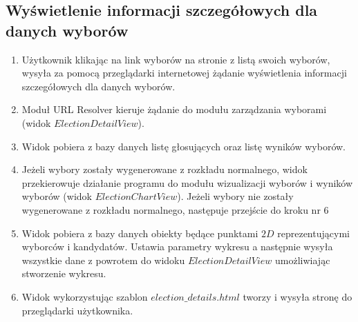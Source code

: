 \documentclass[pdflatex,11pt]{../aghdoc_version2}
\begin{document}
\subsection{Wyświetlenie informacji szczegółowych dla danych wyborów}
\begin{enumerate}
\item Użytkownik klikając na link wyborów na stronie z listą swoich wyborów, wysyła za
pomocą przeglądarki internetowej żądanie wyświetlenia informacji szczegółowych
dla danych wyborów.
\item Moduł URL Resolver kieruje żądanie do modułu zarządzania wyborami (widok
$ElectionDetailView$).
\item Widok pobiera z bazy danych listę głosujących oraz listę wyników wyborów.
\item Jeżeli wybory zostały wygenerowane z rozkładu normalnego, widok przekierowuje
działanie programu do modułu wizualizacji wyborów i wyników wyborów (widok
$ElectionChartView$). Jeżeli wybory nie zostały wygenerowane z rozkładu normalnego, następuje przejście do kroku nr $6$
\item Widok pobiera z bazy danych obiekty będące punktami $2D$ reprezentującymi
wyborców i kandydatów. Ustawia parametry wykresu a następnie wysyła wszystkie
dane z powrotem do widoku $ElectionDetailView$ umożliwiając stworzenie wykresu.
\item Widok wykorzystując szablon $election\_details.html$ tworzy i wysyła stronę do
przeglądarki użytkownika.
\end{enumerate}
\end{document}
